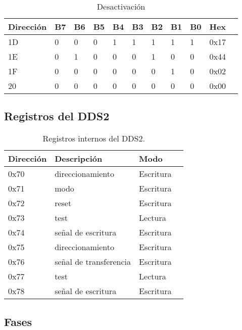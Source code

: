     \begin{table}[ht]
    \centering
    \begin{tabular}{|l|l|l|l|l|l|l|l|l|l|l|}
    \hline
    Direcci\'on  &B7 & B6 & B5 & B4& B3 & B2& B1 & B0 &Hex\\
    \hline
    1D  &0 & 0 & 0 & 1& 1 & 1& 1 & 1 &0x17\\
    \hline
    1E  &0 & 1 & 0 & 0& 0 & 1& 0 & 0 &0x44\\
    \hline
    1F  &0 & 0 & 0 & 0& 0 & 0& 1 & 0 & 0x02\\
    \hline
    20  &0 & 0 & 0 & 0 & 0 & 0& 0 & 0&0x00 \\
    \hline
    \end{tabular}
    \caption{\label{tab:dds2_deactivate}Desactivaci\'on}
    \end{table}
\newpage
\subsection{Registros del DDS2}
\begin{table}[ht]
    \centering
    \begin{tabular}{|l|l|l|l|}
    \hline
    Direcci\'on  & Descripci\'on             & Modo      \\
    \hline
    0x70       & direccionamiento        & Escritura \\
    \hline
    0x71       & modo                    & Escritura \\
    \hline
    0x72       & reset                   & Escritura \\
    \hline
    0x73       & test                    & Lectura   \\
    \hline
    0x74       & se\~nal de escritura      & Escritura \\
    \hline
    0x75       & direccionamiento        & Escritura \\
    \hline
    0x76       & se\~nal de transferencia  & Escritura \\
    \hline
    0x77       & test                    & Lectura   \\
    \hline
    0x78       & se\~nal de escritura      & Escritura \\
    \hline
\end{tabular}
\caption{\label{tab:registros_internos_dds2}Registros internos del DDS2.}
\end{table}


\subsection{Fases}


